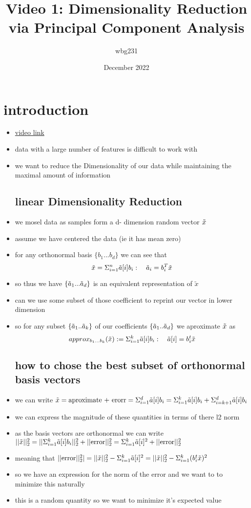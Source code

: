\documentclass{article}
\title{Video 1: Dimensionality Reduction via Principal Component Analysis}
\author{wbg231 }
\date{December 2022}
\begin{document}
\maketitle

\section*{introduction}
\begin{itemize}
\item \href{https://www.youtube.com/watch?v=ODMRtd3dj7s&ab_channel=CarlosFernandez-Granda}{video link}
\item data with a large number of features is difficult to work with 
\item we want to reduce the Dimensionality of our data while maintaining the maximal amount of information
\subsection*{linear Dimensionality Reduction}
\item we mosel data as samples form a d- dimension random vector $\Tilde{x}$
\item assume we have centered the data (ie it has mean zero)
\item for any orthonormal basis $\{b_1...b_d\}$ we can see that $$\Tilde{x}=\Sigma_{i=1}^{n}\Tilde{a}[i]b_i: \quad \Tilde{a}_i=b_{i}^{T}\Tilde{x}$$
\item so thus we have $\{\Tilde{a}_1...\Tilde{a}_d\}$ is an equivalent representation of $\tilde{x}$
\item  can we use some subset of those coefficient to reprint our vector in lower dimension
\item so for any subset $\{\Tilde{a}_1..\Tilde{a}_k\}$ of our coefficients $\{\Tilde{a}_1..\Tilde{a}_d\}$ we aproximate $\Tilde{x}$ as $$approx_{b_1...b_k}(\Tilde{x}):=\Sigma_{i=1}^{k}\Tilde{a}[i]b_i:\quad \Tilde{a}[i]=b_i^t\Tilde{x}$$
\subsection*{how to chose the best subset of orthonormal basis vectors}
\item we can write $\Tilde{x}=\text{aproximate + erorr}=\Sigma_{i=1}^{d}\Tilde{a}[i]b_i=\Sigma_{i=1}^{k}\Tilde{a}[i]b_i+\Sigma_{i=k+1}^{d}\Tilde{a}[i]b_i$
\item we can express the magnitude of these quantities in terms of there l2 norm 
\item as the basis vectors are orthonormal we can write $||\Tilde{x}||_{2}^{2}=||\Sigma_{i=1}^{k}\Tilde{a}[i]b_i||_{2}^{2}+||\text{error}||_{2}^{2}=\Sigma_{i=1}^{k}\Tilde{a}[i]^{2}+||\text{error}||_{2}^{2}$
\item meaning that $||\text{error}||_{2}^{2}|=||\Tilde{x}||_{2}^{2}-\Sigma_{i=1}^{k}\Tilde{a}[i]^{2}=||\Tilde{x}||_{2}^{2}-\Sigma_{i=1}^{k}(b_i^t\Tilde{x})^2$
\item so we have an expression for the norm of the error and we want to to minimize this naturally 
\item this is a random quantity so we want to minimize it's expected value

\end{itemize}
\end{document}

